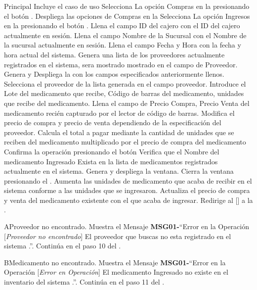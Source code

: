 	\begin{UCtrayectoria}{Principal}
		\UCpaso Incluye el caso de uso  
		\UCpaso[\UCactor] Selecciona La opción Compras en la  presionando el botón .
		\UCpaso Despliega las opciones de Compras en la 
		\UCpaso [\UCactor] Selecciona La opción Ingresos en la  presionando el botón .
		\UCpaso Llena el campo ID del cajero con el ID del cajero actualmente en sesión.
		\UCpaso Llena el campo Nombre de la Sucursal con el Nombre de la sucursal actualmente en sesión.
		\UCpaso Llena el campo Fecha y Hora con la fecha y hora actual del sistema.
		\UCpaso Genera una lista de los proveedores actualmente registrados en el sistema, sera mostrado mostrado en el campo de Proveedor.
		\UCpaso Genera y Despliega la  con los campos especificados anteriormente llenos.
		\UCpaso[\UCactor] Selecciona el proveedor de la lista generada en el campo proveedor. 
		\UCpaso[\UCactor] Introduce el Lote del medicamento que recibe, Código de barras del medicamento, unidades que recibe del medicamento. 
		\UCpaso Llena el campo de Precio Compra, Precio Venta del medicamento recién capturado por el lector de código de barras.
		\UCpaso [\UCactor] Modifica el precio de compra y precio de venta dependiendo de la especificación del proveedor.
		\UCpaso Calcula el total a pagar mediante la cantidad de unidades que se reciben del medicamento multiplicado por el precio de compra del medicamento
		\UCpaso[\UCactor] Confirma la operación presionando el botón 
		\UCpaso Verifica que el Nombre del medicamento Ingresado Exista en la lista de medicamentos registrados actualmente en el sistema.
		\UCpaso Genera y despliega la ventana.  
		\UCpaso [\UCactor] Cierra la ventana presionando el .
		\UCpaso Aumenta las unidades de medicamento que acaba de recibir en el sistema conforme a las unidades que se ingresaron. 
		\UCpaso Actualiza el precio de compra y venta del medicamento existente con el que acaba de ingresar. 
		\UCpaso Redirige al [\UCactor] a la  .
	\end{UCtrayectoria}


\begin{UCtrayectoriaA}{A}{Proveedor no encontrado.}
			\UCpaso Muestra el Mensaje {\bf MSG01-}``Error en la Operación [{\em Proveedor no encontrado}] El proveedor que buscas no esta registrado en el sistema .''.
			\UCpaso Continúa en el paso 10 del .
		\end{UCtrayectoriaA}
\begin{UCtrayectoriaA}{B}{Medicamento no encontrado.}
			\UCpaso Muestra el Mensaje {\bf MSG01-}``Error en la Operación [{\em Error en Operación}] El medicamento Ingresado no existe en el inventario del sistema .''.
			\UCpaso Continúa en el paso 11 del .
		\end{UCtrayectoriaA}
		
